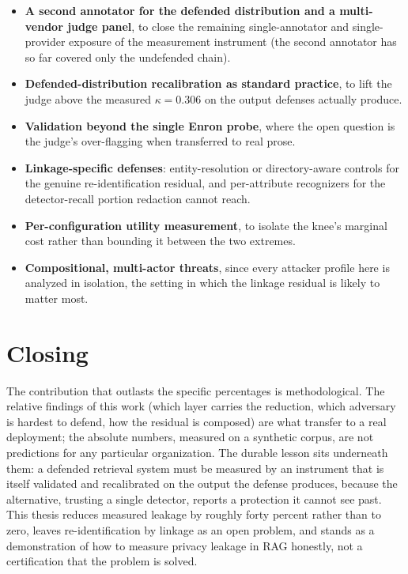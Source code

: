 \begin{itemize}[leftmargin=1.4em, itemsep=2pt]
  \item \textbf{A second annotator for the defended distribution and a multi-vendor judge
    panel}, to close the remaining single-annotator and single-provider exposure of the
    measurement instrument (the second annotator has so far covered only the undefended chain).
  \item \textbf{Defended-distribution recalibration as standard practice}, to lift the judge
    above the measured $\kappa = 0.306$ on the output defenses actually produce.
  \item \textbf{Validation beyond the single Enron probe}, where the open question is the
    judge's over-flagging when transferred to real prose.
  \item \textbf{Linkage-specific defenses}: entity-resolution or directory-aware controls for
    the genuine re-identification residual, and per-attribute recognizers for the
    detector-recall portion redaction cannot reach.
  \item \textbf{Per-configuration utility measurement}, to isolate the knee's marginal cost
    rather than bounding it between the two extremes.
  \item \textbf{Compositional, multi-actor threats}, since every attacker profile here is
    analyzed in isolation, the setting in which the linkage residual is likely to matter most.
\end{itemize}

\section{Closing}
\label{sec:concl-closing}

The contribution that outlasts the specific percentages is methodological. The relative findings
of this work (which layer carries the reduction, which adversary is hardest to defend, how the
residual is composed) are what transfer to a real deployment; the absolute numbers, measured on
a synthetic corpus, are not predictions for any particular organization. The durable lesson sits
underneath them: a defended retrieval system must be measured by an instrument that is itself
validated and recalibrated on the output the defense produces, because the alternative, trusting
a single detector, reports a protection it cannot see past. This thesis reduces measured leakage
by roughly forty percent rather than to zero, leaves re-identification by linkage as an open
problem, and stands as a demonstration of how to measure privacy leakage in RAG honestly, not
a certification that the problem is solved.



\nocite{*}




